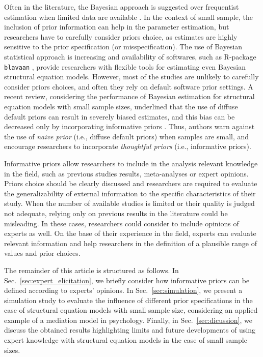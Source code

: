 \documentclass[graybox]{svmult}
\begin{document}
Often in the literature, the Bayesian approach is suggested over frequentist estimation when limited data are available \cite{mcneishUsingBayesianMethods2016a}.  In the context of small sample, the inclusion of prior information can help in the parameter estimation, but researchers have to carefully consider priors choice, as estimates are highly sensitive to the prior specification (or misspecification). The use of Bayesian statistical approach is increasing and availability of softwares, such as R-package \texttt{blavaan} \cite{merkleBlavaanBayesianStructural2018},  provide researchers with flexible tools for estimating even Bayesian structural equation models. However, most of the studies are unlikely to carefully consider priors choices, and often they rely on default software prior settings. A recent review, considering the performance of Bayesian estimation for structural equation models with small sample sizes, underlined that the use of diffuse default priors can result in severely biased estimates, and this bias can be decreased only by incorporating informative priors \cite{smidBayesianFrequentistEstimation2020}. Thus, authors warn against the use of \emph{naive prior} (i.e., diffuse default priors) when samples are small, and encourage researchers to incorporate \emph{thoughtful priors} (i.e., informative priors).

Informative priors allow researchers to include in the analysis relevant knowledge in the field, such as previous studies results, meta-analyses or expert opinions. Priors choice should be clearly discussed and researchers are required to evaluate the generalizability of external information to the specific characteristics of their study. When the number of available studies is limited or their quality is judged not adequate, relying only on previous results in the literature could be misleading. In these cases, researchers could consider to include opinions of experts as well. On the base of their experience in the field, experts can evaluate relevant information and help researchers in the definition of a plausible range of values and prior choices.

The remainder of this article is structured as follows. In Sec.~\ref{sec:expert_elicitation}, we briefly consider how informative priors can be defined according to experts' opinions. In Sec.~\ref{sec:simulation}, we present a simulation study to evaluate the influence of different prior specifications in the case of structural equation models with small sample size, considering an applied example of a mediation model in psychology. Finally, in Sec.~\ref{sec:dicussion}, we discuss the obtained results highlighting limits and future developments of using expert knowledge with structural equation models in the case of  small sample sizes.
\end{document}
